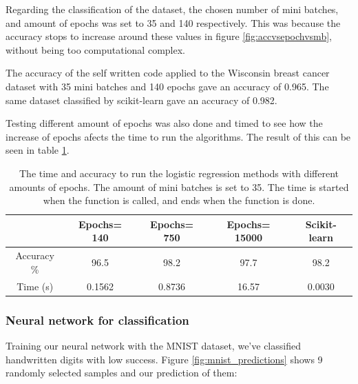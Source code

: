 \documentclass[../main.tex]{subfiles}
\begin{document}
Regarding the classification of the dataset, the chosen number of mini batches, and amount of epochs was set to 35 and 140 respectively. This was because the accuracy stops to increase around these values in figure \ref{fig:accvsepochvsmb}, without being too computational complex. 

The accuracy of the self written code applied to the Wisconsin breast cancer dataset with 35 mini batches and 140 epochs gave an accuracy of 0.965. The same dataset classified by scikit-learn gave an accuracy of 0.982.

Testing different amount of epochs was also done and timed to see how the increase of epochs afects the time to run the algorithms. The result of this can be seen in table \ref{tab:timetime}.


\begin{table}[H]
\centering
\caption{The time and accuracy to run the logistic regression methods with different amounts of epochs. The amount of mini batches is set to 35. The time is started when the function is called, and ends when the function is done.}
\begin{tabular}{ ccccc } 
 \toprule
  & Epochs= 140 & Epochs= 750 & Epochs= 15000 & Scikit-learn \\ 
 \midrule
 Accuracy \%  & 96.5 & 98.2 & 97.7 & 98.2\\
 
 Time (s) & 0.1562 & 0.8736 & 16.57 & 0.0030 \\ 
 \bottomrule
\end{tabular}
\label{tab:timetime}
\end{table}


\subsubsection{Neural network for classification}

Training our neural network with the MNIST dataset, we've classified handwritten digits with low success. Figure \ref{fig:mnist_predictions} shows 9 randomly selected samples and our prediction of them:
\end{document}
